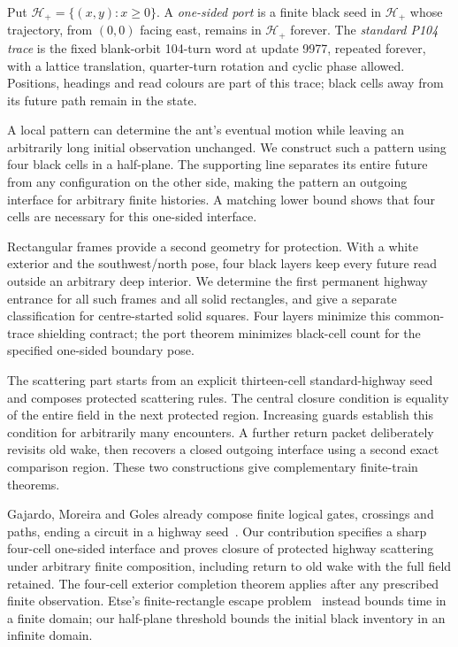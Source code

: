 \documentclass[11pt]{article}
\newcommand{\HH}{\mathcal H}
\begin{document}
Put $\HH_+=\{(x,y):x\ge0\}$. A \emph{one-sided port} is a finite black seed
in $\HH_+$ whose trajectory, from $(0,0)$ facing east, remains in $\HH_+$
forever. The \emph{standard P104 trace} is the fixed blank-orbit 104-turn word
at update 9977, repeated forever, with a lattice translation, quarter-turn
rotation and cyclic phase allowed. Positions, headings and read colours are
part of this trace; black cells away from its future path remain in the state.

A local pattern can determine the ant's eventual motion while leaving an
arbitrarily long initial observation unchanged. We construct such a pattern
using four black cells in a half-plane. The supporting line separates its
entire future from any configuration on the other side, making the pattern
an outgoing interface for arbitrary finite histories. A matching lower bound
shows that four cells are necessary for this one-sided interface.

Rectangular frames provide a second geometry for protection. With a white
exterior and the southwest/north pose, four black layers keep every future read
outside an arbitrary deep interior. We determine the first permanent highway
entrance for all such frames and all solid rectangles, and give a separate
classification for centre-started solid squares. Four layers minimize this
common-trace shielding contract; the port theorem minimizes black-cell count
for the specified one-sided boundary pose.

The scattering part starts from an explicit thirteen-cell standard-highway
seed and composes protected scattering rules. The central
closure condition is equality of the entire field in the next protected
region. Increasing guards establish this condition for arbitrarily many
encounters. A further return packet deliberately revisits old wake, then
recovers a closed outgoing interface using a second exact comparison region.
These two constructions give complementary finite-train theorems.

Gajardo, Moreira and Goles already compose finite logical gates, crossings
and paths, ending a circuit in a highway seed~\cite[Section~2]{gajardo2002}.
Our contribution specifies a sharp four-cell one-sided interface and proves
closure of protected highway scattering under arbitrary finite composition,
including return to old wake with the full field retained. The four-cell
exterior completion theorem applies after any prescribed finite observation.
Etse's finite-rectangle escape problem~\cite{etse2026} instead bounds time in
a finite domain; our half-plane threshold bounds the initial black inventory
in an infinite domain.
\end{document}
